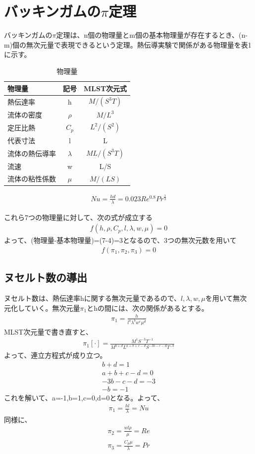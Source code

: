 \documentclass[a4j,twoside,openright,11pt]{jarticle}
\begin{document}
\section{バッキンガムの$\pi$定理}
バッキンガムの$\pi$定理は、n個の物理量とm個の基本物理量が存在するとき、(n-m)個の無次元量で表現できるという定理。熱伝導実験で関係がある物理量を表1に示す。
\begin{table}[htb]
\begin{center}
  \caption{物理量}
  \begin{tabular}{lcc} \hline
物理量&記号&MLST次元式\\\hline
熱伝達率&h&$M/(S^3T)$\\
流体の密度&$\rho$&$M/L^3$\\
定圧比熱&$C_p$&$L^2/(S^2)$\\
代表寸法&l&L\\
流体の熱伝導率&$\lambda$&$ML/(S^3T)$\\
流速&w&L/S\\
流体の粘性係数&$\mu$&$M/(LS)$\\
\hline
  \end{tabular}
\end{center}
\end{table}
\begin{eqnarray}
Nu = \frac{hd}{\lambda} =0.023Re^{0.8}Pr^{\frac{1}{3}}
\end{eqnarray}

これら7つの物理量に対して、次の式が成立する
\begin{eqnarray}
f(h,\rho,C_p,l,\lambda,w,\mu) = 0
\end{eqnarray}
よって、(物理量-基本物理量)=(7-4)=3となるので、3つの無次元数を用いて
\begin{eqnarray}
f(\pi_1,\pi_2,\pi_3) = 0
\end{eqnarray}
\subsection{ヌセルト数の導出}
ヌセルト数は、熱伝達率hに関する無次元量であるので、$l,\lambda,w,\mu$を用いて無次元化していく。無次元量$\pi_1$とhの間には、次の関係があるとする。
\begin{eqnarray}
\pi_1 = \frac{h}{l^a \lambda^b w^c \mu^d}
\end{eqnarray}
MLST次元量で書き直すと、
\begin{eqnarray}
\pi_1[\cdot] = \frac{M^1S^{-3}T^{-1}}{M^{b+d} L^{a+b+c-d} S^{-3b-c-d} T^{-b}}
\end{eqnarray}
よって、連立方程式が成り立つ。
\begin{eqnarray}
b+d = 1\nonumber\\
a+b+c-d = 0\nonumber\\
-3b-c-d = -3\nonumber\\
-b = -1\nonumber
\end{eqnarray}
これを解いて、a=-1,b=1,c=0,d=0となる。よって、
\begin{eqnarray}
\pi_1 = \frac{hl}{\lambda}= Nu
\end{eqnarray}
同様に、
\begin{eqnarray}
\pi_2 = \frac{wl\rho}{\mu}= Re\\
\pi_3 = \frac{C_p\mu}{\lambda}= Pr
\end{eqnarray}
\end{document}
